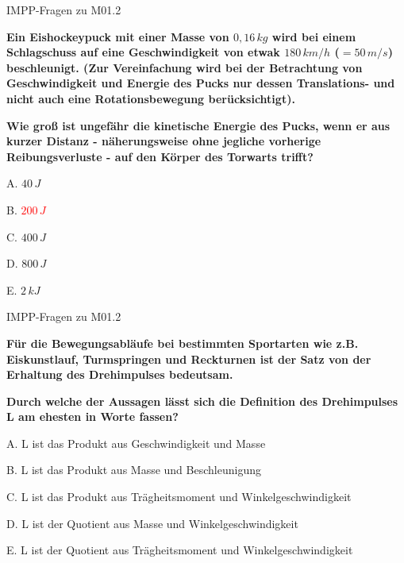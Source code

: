 \documentclass{beamer}
\begin{document}
\begin{frame}{IMPP-Fragen zu M01.2}
    
    \textbf{
    Ein Eishockeypuck mit einer Masse von \(0,16\,kg\) wird bei einem Schlagschuss auf eine Geschwindigkeit von etwak \(180\,km/h\) (\(=50\, m/s\)) beschleunigt. (Zur Vereinfachung wird bei der Betrachtung von Geschwindigkeit und Energie des Pucks nur dessen Translations- und nicht auch eine Rotationsbewegung berücksichtigt).
    } 
    
    \textbf{
    Wie groß ist ungefähr die kinetische Energie des Pucks, wenn er aus kurzer Distanz - näherungsweise ohne jegliche vorherige Reibungsverluste - auf den Körper des Torwarts trifft?
    }\\[0.2 cm]

\begin{description}
\item{A.} \(40\,J\)
\item{B.} \textcolor{red}{\(200\,J\)}  %
\item{C.} \(400\,J\)
\item{D.} \(800\,J\)
\item{E.} \(2\,kJ\)

\end{description}
    
    
\end{frame}




 
\begin{frame}{IMPP-Fragen zu M01.2}

    \textbf{
    Für die Bewegungsabläufe bei bestimmten Sportarten wie z.B. Eiskunstlauf, Turmspringen und Reckturnen ist der Satz von der Erhaltung des Drehimpulses bedeutsam.}
    
    \textbf{Durch welche der Aussagen lässt sich die Definition des Drehimpulses L am ehesten in Worte fassen?
    } \\[0.2 cm]
    
    \begin{description}
\item{A.} L ist das Produkt aus Geschwindigkeit und Masse
\item{B.} L ist das Produkt aus Masse und Beschleunigung
\item{C.} L ist das Produkt aus Trägheitsmoment und Winkelgeschwindigkeit %
\item{D.} L ist der Quotient aus Masse und Winkelgeschwindigkeit
\item{E.}  L ist der Quotient aus Trägheitsmoment und Winkelgeschwindigkeit

\end{description}
    
\end{frame}
\end{document}
